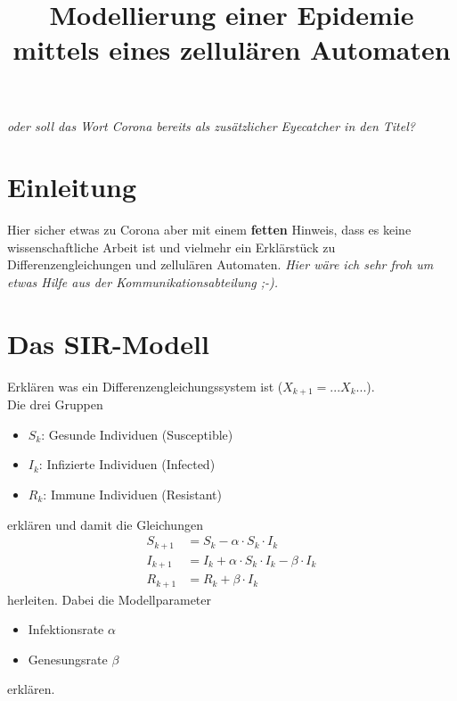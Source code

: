 \documentclass[11pt,a4paper]{article}
\title{
	Modellierung einer Epidemie mittels eines zellulären Automaten
}
\begin{document}
\maketitle

\noindent
\textit{oder soll das Wort Corona bereits als zusätzlicher Eyecatcher in den Titel?}

\section{Einleitung}
Hier sicher etwas zu Corona aber mit einem \textbf{fetten} Hinweis, dass es keine wissenschaftliche Arbeit ist und vielmehr ein Erklärstück zu Differenzengleichungen und zellulären Automaten. \textit{Hier wäre ich sehr froh um etwas Hilfe aus der Kommunikationsabteilung ;-).}

\section{Das SIR-Modell}
Erklären was ein Differenzengleichungssystem ist (\(X_{k+1} = ... X_k ...\)).\\
Die drei Gruppen
\begin{itemize}
	\item \(S_k\): Gesunde Individuen (Susceptible)
	\item \(I_k\): Infizierte Individuen (Infected)
	\item \(R_k\): Immune Individuen (Resistant)
\end{itemize}
erklären und damit die Gleichungen
\begin{align*}
	S_{k+1} &= S_k - \alpha \cdot S_k \cdot I_k \\
	I_{k+1} &= I_k + \alpha \cdot S_k \cdot I_k - \beta \cdot I_k \\
	R_{k+1} &= R_k + \beta \cdot I_k
\end{align*}
herleiten. Dabei die Modellparameter
\begin{itemize}
	\item Infektionsrate \(\alpha\)
	\item Genesungsrate \(\beta\)
\end{itemize}
erklären.
\end{document}
